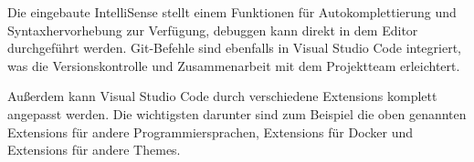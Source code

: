 Die eingebaute IntelliSense stellt einem Funktionen für Autokomplettierung und Syntaxhervorhebung zur Verfügung, debuggen 
kann direkt in dem Editor durchgeführt werden. Git-Befehle sind ebenfalls in Visual Studio Code integriert, was die
Versionskontrolle und Zusammenarbeit mit dem Projektteam erleichtert.

Außerdem kann Visual Studio Code durch verschiedene Extensions komplett angepasst werden. Die wichtigsten darunter sind
zum Beispiel die oben genannten Extensions für andere Programmiersprachen, Extensions für Docker und Extensions für andere
Themes. \cite{vs}
